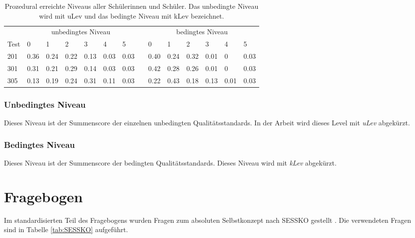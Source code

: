 \begin{table}[htbp]
  \centering
\begin{tabular}{@{}llllllllllllll@{}}
\toprule
 &  \multicolumn{6}{c}{unbedingtes Niveau} &&  \multicolumn{6}{c}{bedingtes Niveau}\\ 
 \cmidrule{2-7} \cmidrule{9-14}
 Test & 0 & 1 & 2 & 3 & 4 & 5 && 0 & 1 & 2 & 3 & 4 & 5\\ 
\midrule
 201 &   0.36 & 0.24 & 0.22 & 0.13 & 0.03 & 0.03 && 0.40 & 0.24 & 0.32  & 0.01 & 0 & 0.03   \\ 
 301 &   0.31 & 0.21 & 0.29 & 0.14 & 0.03 & 0.03  && 0.42 & 0.28 & 0.26 & 0.01 & 0 & 0.03  \\ 
 305 &   0.13 & 0.19 & 0.24 & 0.31 & 0.11 & 0.03  && 0.22 & 0.43 & 0.18 & 0.13 & 0.01 & 0.03 \\ 
\bottomrule
\end{tabular} 
  \caption{Prozedural erreichte Niveaus aller Schülerinnen und Schüler. Das unbedingte Niveau wird mit uLev und das bedingte Niveau mit kLev bezeichnet. }
  \label{tab:Niveau}
\end{table}

\subsubsection{Unbedingtes Niveau}
Dieses Niveau ist der Summenscore der einzelnen unbedingten Qualitätsstandards. In der Arbeit wird dieses Level mit \textit{uLev} abgekürzt.

\subsubsection{Bedingtes Niveau}

Dieses Niveau ist der Summenscore der bedingten Qualitätsstandards. Dieses Niveau wird mit \textit{kLev} abgekürzt.




\section{Fragebogen}

Im standardisierten Teil des Fragebogens wurden Fragen zum absoluten Selbstkonzept nach SESSKO gestellt \citep{Schone2002}. Die verwendeten Fragen sind in Tabelle \ref{tab:SESSKO} aufgeführt. 



